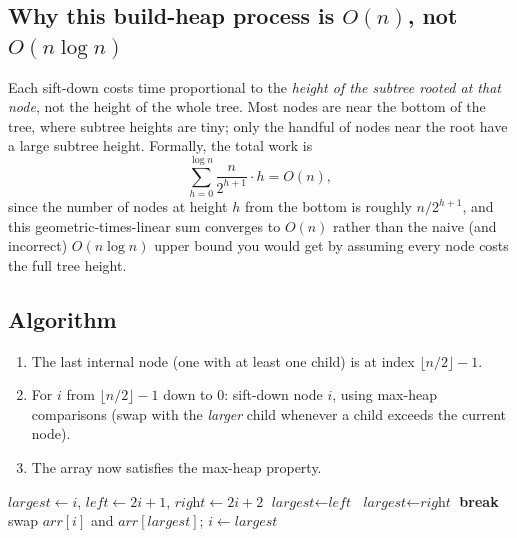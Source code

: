 \subsection*{Why this build-heap process is $O(n)$, not $O(n \log n)$}

Each sift-down costs time proportional to the \emph{height of the subtree
rooted at that node}, not the height of the whole tree. Most nodes are
near the bottom of the tree, where subtree heights are tiny; only the
handful of nodes near the root have a large subtree height. Formally, the
total work is
\[
  \sum_{h=0}^{\log n} \frac{n}{2^{h+1}} \cdot h = O(n),
\]
since the number of nodes at height $h$ from the bottom is roughly
$n/2^{h+1}$, and this geometric-times-linear sum converges to $O(n)$
rather than the naive (and incorrect) $O(n \log n)$ upper bound you would
get by assuming every node costs the full tree height.

\subsection*{Algorithm}

\begin{enumerate}
  \item The last internal node (one with at least one child) is at index
        $\lfloor n/2 \rfloor - 1$.
  \item For $i$ from $\lfloor n/2 \rfloor - 1$ down to $0$: sift-down
        node $i$, using max-heap comparisons (swap with the \emph{larger}
        child whenever a child exceeds the current node).
  \item The array now satisfies the max-heap property.
\end{enumerate}

\begin{algorithm}[H]
\caption{Build a Max-Heap In Place (Heapify)}
\begin{algorithmic}[1]
    \State {}
  \EndFor
\EndProcedure
{}
    \State $\textit{largest} \gets i$, $\textit{left} \gets 2i+1$, $\textit{right} \gets 2i+2$
      \State $\textit{largest} \gets \textit{left}$
    \EndIf
      \State $\textit{largest} \gets \textit{right}$
    \EndIf
     \textbf{break} \EndIf
    \State swap $\textit{arr}[i]$ and $\textit{arr}[\textit{largest}]$; $i \gets \textit{largest}$
  \EndWhile
\EndProcedure
\end{algorithmic}
\end{algorithm}

